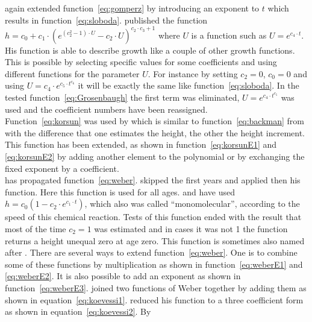 \documentclass[a4paper,twocolumn]{article}
\begin{document}
again extended function~\ref{eq:gomperz} by introducing an exponent to
$t$ which results in function~\ref{eq:sloboda}.
\cite{grosenbaugh1965SigmoidFunction} published the function
$h = c_0 + c_1\cdot (e^{(c_2^2 - 1)\cdot U} - c_2\cdot U)^{c_2\cdot c_3 + 1}$
where $U$ is a function such as $U = e^{c_4\cdot t}$. His
function is able to describe growth like a couple of other growth
functions. This is possible by selecting specific values for some
coefficients and using different functions for the
parameter $U$. For instance by setting $c_2=0$, $c_0=0$ and using
$U = c_4\cdot e^{c_5\cdot t^{c_6}}$ it will be exactly the same like
function~\ref{eq:sloboda}. In the tested function~\ref{eq:Grosenbaugh}
the first term was eliminated, $U = e^{c_4\cdot t^{c_5}}$ was used and
the coefficient numbers have been reassigned.\\
%
Function~\ref{eq:korsun} was used by \cite{kosrun1935Funktion} which
is similar to function~\ref{eq:backman} from
\cite{backmann1931DasWachstumsproblem} with the difference that one
estimates the height, the other the height increment. This function
has been extended, as shown in function~\ref{eq:korsunE1} and
\ref{eq:korsunE2} by adding another element to the polynomial or by
exchanging the fixed exponent by a coefficient.\\
%
\cite{weber1891Forsteinrichtung} has propagated
function~\ref{eq:weber}. \cite{weber1891Forsteinrichtung} skipped the
first years and applied then his function. Here this function is used
for all ages.
\cite{puettner1920StudienUeberPhysiologischeAehnlichkeit6Wachstumsaehnlichkeiten}
and
\cite{bertalanffy1934UntersuchungenUeberDieGesetzlichkeitenDesWachstumsTeilI}
have used $h = c_0 (1 - c_2 \cdot e^{c_1 \cdot t})$, which also was
called ``monomolecular'', according to the speed of this chemical reaction.
Tests of this function ended with the result that most of the time
$c_2 = 1$ was estimated and in cases it was not 1 the function returns
a height unequal zero at age zero. This function is sometimes also
named after \cite{mitscherlich1909Bodenertrag}. There are several
ways to extend function~\ref{eq:weber}. One is to combine some of these
functions by multiplication as shown in function~\ref{eq:weberE1} and
\ref{eq:weberE2}. It is also possible to add an exponent as shown in
function~\ref{eq:weberE3}. \cite{koevessi1928ffGesetzmaessigkeiten}
joined two functions of Weber together by adding them as shown in
equation~\ref{eq:koevessi1}.
\cite{koevessi1929ffGesetzmaessigkeiten4} reduced his function to a
three coefficient form as shown in equation~\ref{eq:koevessi2}. By
\end{document}
